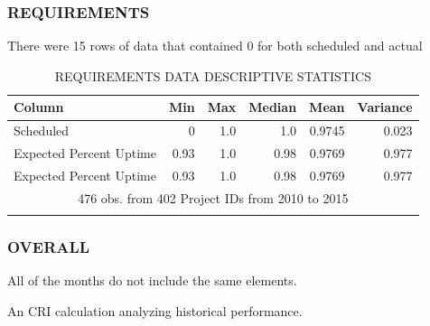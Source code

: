 \documentclass[SDSUThesis.tex]{subfiles}
\begin{document}
        \subsubsection{REQUIREMENTS}
            There were 15 rows of data that contained 0 for both
            scheduled and actual
            \begin{longtable}{@{}l rr rrr}
                \toprule%
                 \centering%
                 {\bfseries Column}
                 & {\bfseries Min}
                 & {\bfseries Max}
                 & {\bfseries Median}
                 & {\bfseries Mean}
                 & {\bfseries Variance} \\
                
                \cmidrule[0.2pt](r{0.125em}){1-1}%
                \cmidrule[0.2pt](lr{0.125em}){2-2}%
                \cmidrule[0.2pt](l{0.125em}){3-3}%
                \cmidrule[0.2pt](l{0.125em}){4-4}%
                \cmidrule[0.2pt](l{0.125em}){5-5}%
                \endhead
                
                Scheduled & 0 & 1.0 & 1.0 & 0.9745 & 0.023 \\
                \myrowcolour%
                Expected Percent Uptime & 0.93 & 1.0 & 0.98 & 0.9769  & 0.977\\
                Expected Percent Uptime & 0.93 & 1.0 & 0.98 & 0.9769  & 0.977\\
                
                \bottomrule
                
                \multicolumn{6}{c}{476 obs. from 402 Project IDs from 2010 to 2015} \\
                
                \caption{REQUIREMENTS DATA DESCRIPTIVE STATISTICS}
                \label{tab:requirements_desc}
            \end{longtable}
            
        \subsubsection{OVERALL}
            All of the months do not include the same elements.  
    
    An CRI calculation analyzing historical performance.


\end{document}
